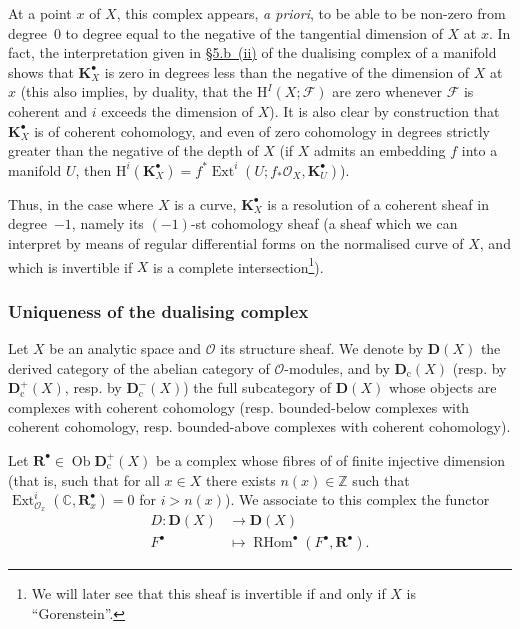 \documentclass[british]{article}
\begin{document}
At a point \(x\) of \(X\), this complex appears, \emph{a priori}, to be
able to be non-zero from degree~\(0\) to degree equal to the negative of
the tangential dimension of \(X\) at \(x\). In fact, the interpretation
given in \hyperref[section-5.b.ii]{§5.b~(ii)} of the dualising complex
of a manifold shows that \(\mathbf{K}_X^\bullet\) is zero in degrees
less than the negative of the dimension of \(X\) at \(x\) (this also
implies, by duality, that the \(\mathrm{H}^I(X;{\mathscr{F}})\) are zero
whenever \({\mathscr{F}}\) is coherent and \(i\) exceeds the dimension
of \(X\)). It is also clear by construction that
\(\mathbf{K}_X^\bullet\) is of coherent cohomology, and even of zero
cohomology in degrees strictly greater than the negative of the depth of
\(X\) (if \(X\) admits an embedding \(f\) into a manifold \(U\), then
\(\mathrm{H}^i(\mathbf{K}_X^\bullet)=f^*\operatorname{Ext}^i(U;f_*{\mathscr{O}}_X,\mathbf{K}_U^\bullet)\)).

Thus, in the case where \(X\) is a curve, \(\mathbf{K}_X^\bullet\) is a
resolution of a coherent sheaf in degree~\(-1\), namely its \((-1)\)-st
cohomology sheaf (a sheaf which we can interpret \autocite{11} by means
of regular differential forms on the normalised curve of \(X\), and
which is invertible if \(X\) is a complete intersection\footnote{We will
  later see that this sheaf is invertible if and only if \(X\) is
  ``Gorenstein''.}).

\subsubsection*{Uniqueness of the dualising
complex}\label{uniqueness-of-the-dualising-complex}

Let \(X\) be an analytic space and \({\mathscr{O}}\) its structure
sheaf. We denote by \(\mathbf{D}(X)\) the derived category of the
abelian category of \({\mathscr{O}}\)-modules, and by
\(\mathbf{D}_\mathrm{c}(X)\) (resp. by \(\mathbf{D}_\mathrm{c}^+(X)\),
resp. by \(\mathbf{D}_\mathrm{c}^-(X)\)) the full subcategory of
\(\mathbf{D}(X)\) whose objects are complexes with coherent cohomology
(resp. bounded-below complexes with coherent cohomology, resp.
bounded-above complexes with coherent cohomology).

Let \(\mathbf{R}^\bullet\in\operatorname{Ob}\mathbf{D}_\mathrm{c}^+(X)\)
be a complex whose fibres of of finite injective dimension (that is,
such that for all \(x\in X\) there exists \(n(x)\in\mathbb{Z}\) such
that
\(\operatorname{Ext}_{{\mathscr{O}}_x}^i(\mathbb{C},\mathbf{R}_x^\bullet)=0\)
for \(i>n(x)\)). We associate to this complex the functor \[
  \begin{aligned}
    D\colon \mathbf{D}(X)
    &\longrightarrow \mathbf{D}(X)
  \\F^\bullet
    &\longmapsto \operatorname{RHom}^\bullet(F^\bullet,\mathbf{R}^\bullet).
  \end{aligned}
\]
\end{document}
